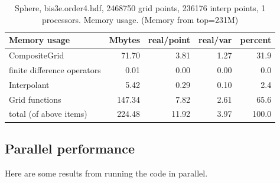 \begin{table}[hbt]
\begin{center}\footnotesize
\begin{tabular}{|l|r|r|r|r|} \hline
   Memory usage       &            Mbytes  &   real/point &  real/var  &  percent   \\ \hline\hline
 CompositeGrid                     &  71.70 &      3.81 &        1.27  &      31.9  \\
 finite difference operators       &   0.01 &      0.00 &        0.00  &       0.0  \\
 Interpolant                       &   5.42 &      0.29 &        0.10  &       2.4  \\
 Grid functions                    & 147.34 &      7.82 &        2.61  &      65.6  \\ \hline
 total (of above items)            & 224.48 &     11.92 &        3.97  &     100.0  \\ \hline
\end{tabular}
\end{center}
\caption{Sphere, bis3e.order4.hdf, 2468750 grid points, 236176 interp points, 1 processors.
         Memory usage. (Memory from top=231M) }
\label{tab:mem:bis3e.order4}
\end{table}


\clearpage
\subsection{Parallel performance}

Here are some results from running the code in parallel.

